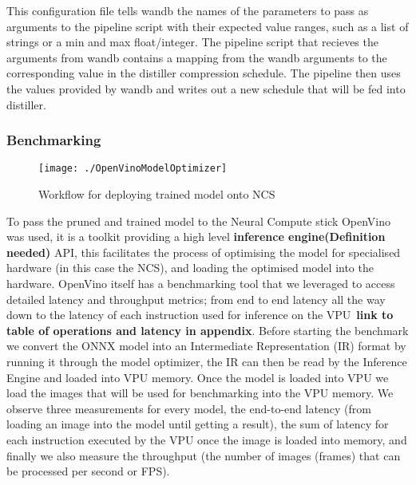 \documentclass[../Dissertation.tex]{subfiles}
\begin{document}


This configuration file tells wandb the names of the parameters to pass as arguments to the pipeline script with their expected value ranges, such as a list of strings or a min and max float/integer. 
The pipeline script that recieves the arguments from wandb contains a mapping from the wandb arguments to the corresponding value in the distiller compression schedule.
The pipeline then uses the values provided by wandb and writes out a new schedule that will be fed into distiller. 

\subsubsection{Benchmarking}

\begin{figure}[H]
	\centering
	\texttt{[image: ./OpenVinoModelOptimizer]}
	\caption{Workflow for deploying trained model onto NCS~\autocite{ModelOptimizerDeveloper}}
	\label{fig:OpenVinoWorkflow}
\end{figure}


To pass the pruned and trained model to the Neural Compute stick OpenVino was used, it is a toolkit providing a high level \textbf{inference engine(Definition needed)} API, this facilitates the process of optimising the model for specialised hardware (in this case the NCS), and loading the optimised model into the hardware. 
OpenVino itself has a benchmarking tool that we leveraged to access detailed latency and throughput metrics; from end to end latency all the way down to the latency of each instruction used for inference on the VPU~\textbf{link to table of operations and latency in appendix}. 
Before starting the benchmark we convert the ONNX model into an Intermediate Representation (IR) format by running it through the model optimizer, the IR can then be read by the Inference Engine and loaded into VPU memory.
Once the model is loaded into VPU we load the images that will be used for benchmarking into the VPU memory.
We observe three measurements for every model, the end-to-end latency (from loading an image into the model until getting a result), the sum of latency for each instruction executed by the VPU once the image is loaded into memory, and finally we also measure the throughput (the number of images (frames) that can be processed per second or FPS).
\end{document}
